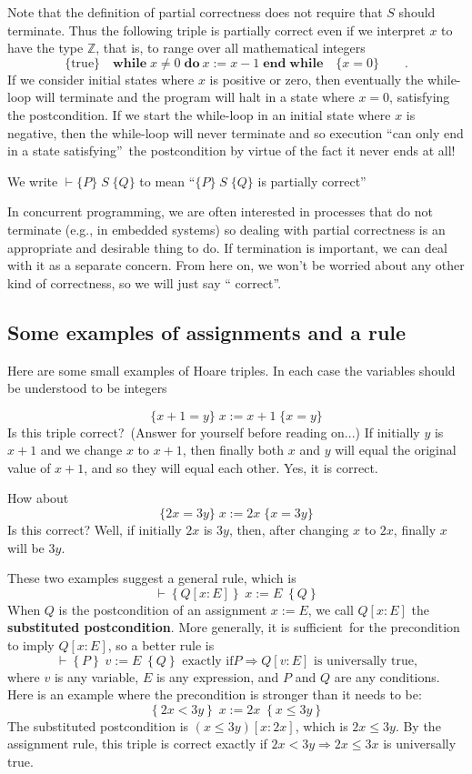 \documentclass[muchmore,11pt]{article}%
\begin{document}
Note that the definition of partial correctness does not require that $S$
should terminate. Thus the following triple is partially correct even if we
interpret $x$ to have the type $\mathbb{Z}$, that is, to range over all
mathematical integers%
\[
\{\mathrm{true}\}\quad\mathbf{while}\;x\neq0\;\mathbf{do}%
\ x:=x-1\;\mathbf{end\;while}\quad\{x=0\}\qquad\text{.}%
\]
If we consider initial states where $x$ is positive or zero, then eventually
the while-loop will terminate and the program will halt in a state where
$x=0$, satisfying the postcondition. If we start the while-loop in an initial
state where $x$ is negative, then the while-loop will never terminate and so
execution \textquotedblleft can only end in a state
satisfying\textquotedblright\ the postcondition by virtue of the fact it never
ends at all!

We write $\vdash\{P\}\;S\;\{Q\}$ to mean \textquotedblleft$\{P\}\;S\;\{Q\}$ is
partially correct\textquotedblright

In concurrent programming, we are often interested in processes that do not
terminate (e.g., in embedded systems) so dealing with partial correctness is
an appropriate and desirable thing to do. If termination is important, we can
deal with it as a separate concern. From here on, we won't be worried about
any other kind of correctness, so we will just say \textquotedblleft
correct\textquotedblright.

\subsection{Some examples of assignments and a rule}

Here are some small examples of Hoare triples. In each case the variables
should be understood to be integers%

\[
\{x+1=y\}\;x:=x+1\;\{x=y\}
\]
Is this triple correct?\ (Answer for yourself before reading on...) If
initially $y$ is $x+1$ and we change $x$ to $x+1$, then finally both $x$ and
$y$ will equal the original value of $x+1$, and so they will equal each other.
Yes, it is correct.

How about%
\[
\{2x=3y\}\;x:=2x\;\{x=3y\}
\]
Is this correct? Well, if initially $2x$ is $3y$, then, after changing $x$ to
$2x$, finally $x$ will be $3y$.

These two examples suggest a general rule, which is%
\[
\vdash\left\{  Q[x:E]\right\}  \;x:=E\;\left\{  Q\right\}
\]
When $Q$ is the postcondition of an assignment $x:=E$, we call $Q[x:E]$ the
\textbf{substituted postcondition}. More generally, it is sufficient\ for the
precondition to imply $Q[x:E]$, so a better rule is%
\[
\vdash\left\{  P\right\}  \;v:=E\;\left\{  Q\right\}  \text{ exactly if
}P\Rightarrow Q[v:E]\text{ is universally true,}%
\]
where $v$ is any variable, $E$ is any expression, and $P$ and $Q$ are any
conditions. Here is an example where the precondition is stronger than it
needs to be:%
\[
\left\{  2x<3y\right\}  \;x:=2x\;\left\{  x\leq3y\right\}
\]
The substituted postcondition is $(x\leq3y)[x:2x]$, which is $2x\leq3y$. By
the assignment rule, this triple is correct exactly if $2x<3y\Rightarrow
2x\leq3x$ is universally true.
\end{document}
